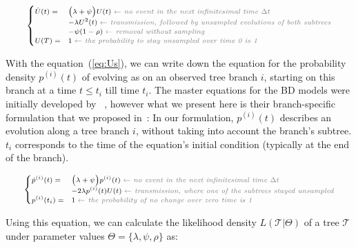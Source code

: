 \documentclass[a4paper,10pt]{article}
\begin{document}
\begin{equation}
\scriptsize
\begin{cases}
\dot{U}(t) = &\Big(\lambda + \psi\Big) U(t)\; \textit{\color{gray} $\leftarrow$ no event in the next infinitesimal time $\Delta t$ }\\
    &- \lambda U^2(t) \;  \textit{\color{gray} $\leftarrow$ transmission, followed by unsampled evolutions of both subtrees}\\
    &- \psi (1 - \rho)\;  \textit{\color{gray} $\leftarrow$ removal without sampling}\\
U(T) = & 1\;  \textit{\color{gray} $\leftarrow$ the probability to stay unsampled over time 0 is 1} \label{eq:Us}
\end{cases}
\end{equation}


With the equation~(\ref{eq:Us}), we can write down the equation for the probability density $p^{(i)}(t)$ of evolving as on an observed tree branch $i$, starting on this branch at a time $t \leq t_i$ till time $t_i$. The master equations for the BD models were initially developed by ~\citet{Stadler2009}, however what we present here is their branch-specific formulation that we proposed in~\citep{zhukovaFastAccurateMaximumLikelihood2022}:
In our formulation, ${p}^{(i)}(t)$ describes an evolution along a tree branch $i$, without taking into account the branch's subtree. $t_i$ corresponds to the time of the equation's initial condition (typically at the end of the branch). %

\begin{equation}
\scriptsize
\begin{cases}
\dot{p}^{(i)}(t) = & \Big(\lambda + \psi\Big) p^{(i)}(t)\; \textit{\color{gray} $\leftarrow$ no event in the next infinitesimal time $\Delta t$ }\\
    & - 2 \lambda p^{(i)}(t)U(t)\;  \textit{\color{gray} $\leftarrow$ transmission, where one of the subtrees stayed unsampled}\\
p^{(i)}(t_i) =  &1\;  \textit{\color{gray} $\leftarrow$ the probability of no change over zero time is 1}
\end{cases}\label{eq:p}
\end{equation}


Using this equation, we can calculate the likelihood density $L(\mathscr{T}|\Theta)$ of a tree $\mathscr{T}$ under parameter values $\Theta = \{\lambda, \psi, \rho\}$ as:
\end{document}
